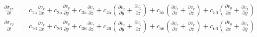 \begin{small}
\begin{align}
	\nonumber\\
	\frac{\partial{\sigma_{xz}}}{\partial{t}}&=c_{15}\frac{\partial{v_x}}{\partial{x}}+c_{25}\frac{\partial{v_y}}{\partial{y}}+c_{35}\frac{\partial{v_z}}{\partial{z}}+c_{45}(\frac{\partial{v_z}}{\partial{y}}+\frac{\partial{v_y}}{\partial{z}})+c_{55}(\frac{\partial{v_z}}{\partial{x}}+\frac{\partial{v_x}}{\partial{z}})+c_{56}(\frac{\partial{v_y}}{\partial{x}}+\frac{\partial{v_x}}{\partial{y}})
	\nonumber\\
	\frac{\partial{\sigma_{xy}}}{\partial{t}}&=c_{16}\frac{\partial{v_x}}{\partial{x}}+c_{26}\frac{\partial{v_y}}{\partial{y}}+c_{36}\frac{\partial{v_z}}{\partial{z}}+c_{46}(\frac{\partial{v_z}}{\partial{y}}+\frac{\partial{v_y}}{\partial{z}})+c_{56}(\frac{\partial{v_z}}{\partial{x}}+\frac{\partial{v_x}}{\partial{z}})+c_{66}(\frac{\partial{v_y}}{\partial{x}}+\frac{\partial{v_x}}{\partial{y}})
\end{align}
\end{small}
	
